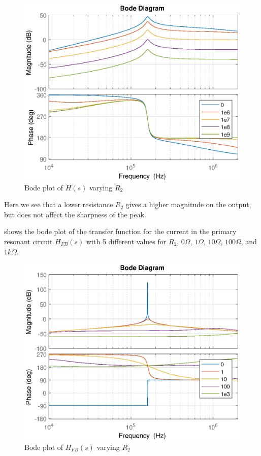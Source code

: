 \begin{figure}[H]
    \centering
    \includegraphics[width=\textwidth]{img/CoilRigBode_R2.eps}
    \caption{Bode plot of $H(s)$ varying $R_2$}
    \label{fig:bode_r2}
\end{figure}

Here we see that a lower resistance $R_2$ gives a higher magnitude on the output, but does not affect the sharpness of the peak.

 shows the bode plot of the transfer function for the current in the primary resonant circuit $H_{FB}(s)$ with 5 different values for $R_2$, $0\Omega$, $1\Omega$, $10\Omega$, $100\Omega$, and $1k\Omega$.
\begin{figure}[H]
    \centering
    \includegraphics[width=\textwidth]{img/FeedBackBode_R2.eps}
    \caption{Bode plot of $H_{FB}(s)$ varying $R_2$}
    \label{fig:fbbode_r2}
\end{figure}


